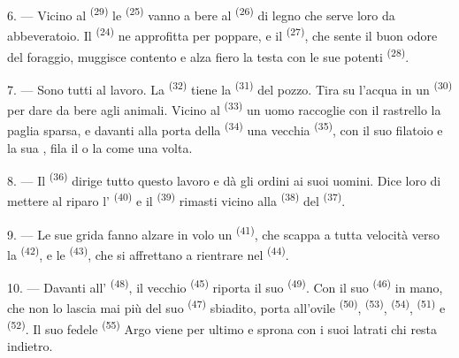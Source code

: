 6. --- Vicino al  \textsuperscript{(29)} le 
\textsuperscript{(25)} vanno a bere al  \textsuperscript{(26)} di legno
che serve loro da abbeveratoio. Il  \textsuperscript{(24)} ne
approfitta per poppare, e il  \textsuperscript{(27)}, che sente il buon
odore del foraggio, muggisce contento e alza fiero la testa con le sue potenti
 \textsuperscript{(28)}.

7. --- Sono tutti al lavoro. La  \textsuperscript{(32)} tiene la
 \textsuperscript{(31)} del pozzo. Tira su l'acqua in un
 \textsuperscript{(30)} per dare da bere agli animali. Vicino al
 \textsuperscript{(33)} un uomo raccoglie con il rastrello la paglia
sparsa, e davanti alla porta della  \textsuperscript{(34)} una
vecchia  \textsuperscript{(35)}, con il suo filatoio e la sua
, fila il  o la  come una volta.

\VUsaut{3.0mm}
\VUsaut{3.0mm}

8. --- Il  \textsuperscript{(36)} dirige tutto questo lavoro e dà gli
ordini ai suoi uomini. Dice loro di mettere al riparo l'
\textsuperscript{(40)} e il  \textsuperscript{(39)} rimasti vicino alla
 \textsuperscript{(38)} del  \textsuperscript{(37)}.

9. --- Le sue grida fanno alzare in volo un  \textsuperscript{(41)},
che scappa a tutta velocità verso la  \textsuperscript{(42)}, e le
 \textsuperscript{(43)}, che si affrettano a rientrare nel
 \textsuperscript{(44)}.

10. --- Davanti all' \textsuperscript{(48)}, il vecchio 
\textsuperscript{(45)} riporta il suo  \textsuperscript{(49)}. Con il
suo  \textsuperscript{(46)} in mano, che non lo lascia mai più del
suo  \textsuperscript{(47)} sbiadito, porta all'ovile
 \textsuperscript{(50)},  \textsuperscript{(53)},
 \textsuperscript{(54)},  \textsuperscript{(51)} e
 \textsuperscript{(52)}. Il suo fedele 
\textsuperscript{(55)} Argo viene per ultimo e sprona con i suoi latrati chi resta
indietro.

